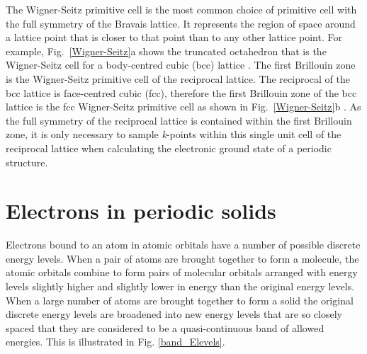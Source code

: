 \documentclass[11pt, twoside]{report}
\begin{document}
The Wigner-Seitz primitive cell is the most common choice of primitive cell with the full symmetry of the Bravais lattice. It represents the region of space around a lattice point  that is closer to that point than to any other lattice point. For example, Fig.~\ref{Wigner-Seitz}a shows the truncated octahedron that is the Wigner-Seitz cell for a body-centred cubic (bcc) lattice \cite{AshcroftMermin2}.
The first Brillouin zone is the Wigner-Seitz primitive cell of the reciprocal lattice. The reciprocal of the bcc lattice is face-centred cubic (fcc), therefore the first Brillouin zone of the bcc lattice is the fcc Wigner-Seitz primitive cell as shown in Fig.~\ref{Wigner-Seitz}b \cite{AshcroftMermin3}. As the full symmetry of the reciprocal lattice is contained within the first Brillouin zone, it is only necessary to sample \textit{k}-points within this single unit cell of the reciprocal lattice when calculating the electronic ground state of a periodic structure.



\section{Electrons in periodic solids}\label{BandTheorySection}


Electrons bound to an atom in atomic orbitals have a number of possible discrete energy levels. When a pair of atoms are brought together to form a molecule, the atomic orbitals combine to form pairs of molecular orbitals arranged with energy levels slightly higher and slightly lower in energy than the original energy levels. When a large number of atoms are brought together to form a solid the 
original discrete energy levels are broadened into new energy levels that are so closely spaced that they are considered to be a quasi-continuous band of allowed energies. This is illustrated in Fig. \ref{band_Elevels}. 
\end{document}
